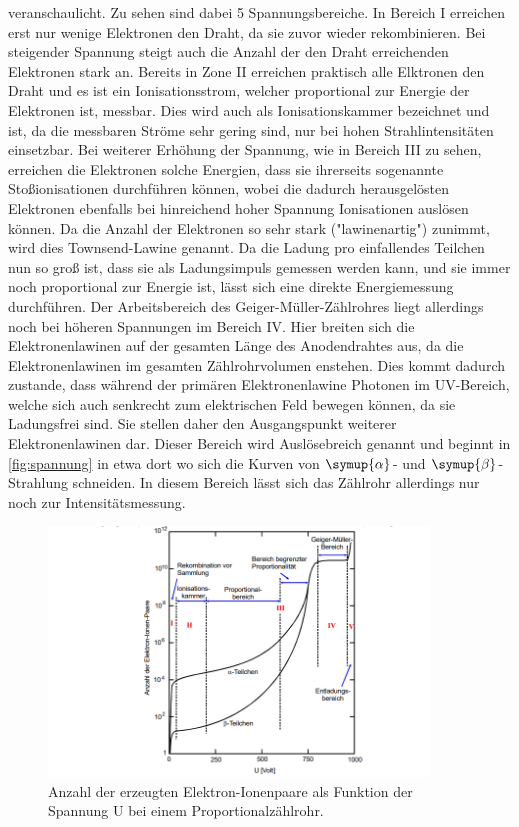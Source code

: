 veranschaulicht. Zu sehen sind dabei 5 Spannungsbereiche. In Bereich I erreichen erst nur wenige Elektronen den Draht, da sie zuvor
wieder rekombinieren. Bei steigender Spannung steigt auch die Anzahl der den Draht erreichenden Elektronen stark an. Bereits in Zone II
erreichen praktisch alle Elktronen den Draht und es ist ein Ionisationsstrom, welcher proportional zur Energie der Elektronen ist, messbar.
Dies wird auch als Ionisationskammer bezeichnet und ist, da die messbaren Ströme sehr gering sind, nur bei hohen Strahlintensitäten einsetzbar.
Bei weiterer Erhöhung der Spannung, wie in Bereich III zu sehen, erreichen die Elektronen solche Energien, dass sie ihrerseits sogenannte
Stoßionisationen durchführen können, wobei die dadurch herausgelösten Elektronen ebenfalls bei hinreichend hoher Spannung Ionisationen
auslösen können. Da die Anzahl der Elektronen so sehr stark ("lawinenartig") zunimmt, wird dies Townsend-Lawine genannt. Da die
Ladung pro einfallendes Teilchen nun so groß ist, dass sie als Ladungsimpuls gemessen werden kann, und sie immer noch proportional zur
Energie ist, lässt sich eine direkte Energiemessung durchführen.
Der Arbeitsbereich des Geiger-Müller-Zählrohres liegt allerdings noch bei höheren Spannungen im Bereich IV. Hier breiten
sich die Elektronenlawinen auf der gesamten Länge des Anodendrahtes aus, da die Elektronenlawinen im gesamten Zählrohrvolumen
enstehen. Dies kommt dadurch zustande, dass während der primären Elektronenlawine Photonen im UV-Bereich, welche sich auch senkrecht
zum elektrischen Feld bewegen können, da sie Ladungsfrei sind. Sie stellen daher den Ausgangspunkt weiterer Elektronenlawinen dar.
Dieser Bereich wird Auslösebreich genannt und beginnt in \autoref{fig:spannung} in etwa dort wo sich die Kurven von $\symup{\alpha}$- und
$\symup{\beta}$- Strahlung schneiden.
In diesem Bereich lässt sich das Zählrohr allerdings nur noch zur Intensitätsmessung.
\begin{figure}
    \centering
    \includegraphics[width=0.9\textwidth]{content/bereich.png}
    \caption{Anzahl der erzeugten Elektron-Ionenpaare als Funktion der Spannung U bei einem Proportionalzählrohr.}
    \label{fig:spannung}
\end{figure}
